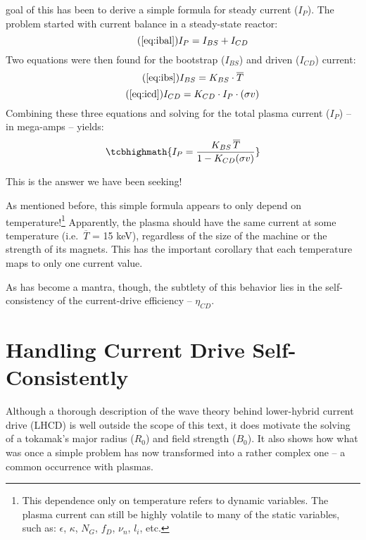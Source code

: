  goal of this  has been to derive a simple formula for steady current ($I_P$). The problem started with current balance in a steady-state reactor:
\begin{equation}
	\tag{\ref{eq:ibal}}
	I_P = I_{BS} + I_{CD}
\end{equation}
Two equations were then found for the bootstrap ($I_{BS}$) and driven ($I_{CD}$) current:
\begin{equation}
	\tag{\ref{eq:ibs}}
	I_{BS} = K_{BS} \cdot \overline T
\end{equation}
\begin{equation}
	\tag{\ref{eq:icd}}
	I_{CD} = K_{CD} \cdot I_P \cdot ( \sigma v )
\end{equation}
Combining these three equations and solving for the total plasma current ($I_P$) -- in mega-amps -- yields:
\begin{equation}
	\label{eq:steady}
	\tcbhighmath{
	I_P = \frac{ K_{BS} \, \overline T }{ 1 - K_{CD} ( \sigma v ) }
	}
	\myequations{Steady Current -- $I_P$}
\end{equation}

This is the answer we have been seeking!

As mentioned before, this simple formula appears to only depend on temperature!\footnote{ This dependence only on temperature refers to dynamic variables. The plasma current can still be highly volatile to many of the static variables, such as: $\epsilon$, $\kappa$, $N_G$, $f_D$, $\nu_n$, $l_i$, etc. } Apparently, the plasma should have the same current at some temperature (i.e.\ $\overline T$ = 15 keV), regardless of the size of the machine or the strength of its magnets. This has the important corollary that each temperature maps to only one current value. 

As has become a mantra, though, the subtlety of this behavior lies in the self-consistency of the current-drive efficiency -- $\eta_{CD}$.

\section{Handling Current Drive Self-Consistently}

Although a thorough description of the wave theory behind lower-hybrid current drive (LHCD) is well outside the scope of this text, it does motivate the solving of a tokamak's major radius ($R_0$) and field strength ($B_0$). It also shows how what was once a simple problem has now transformed into a rather complex one -- a common occurrence with plasmas.

